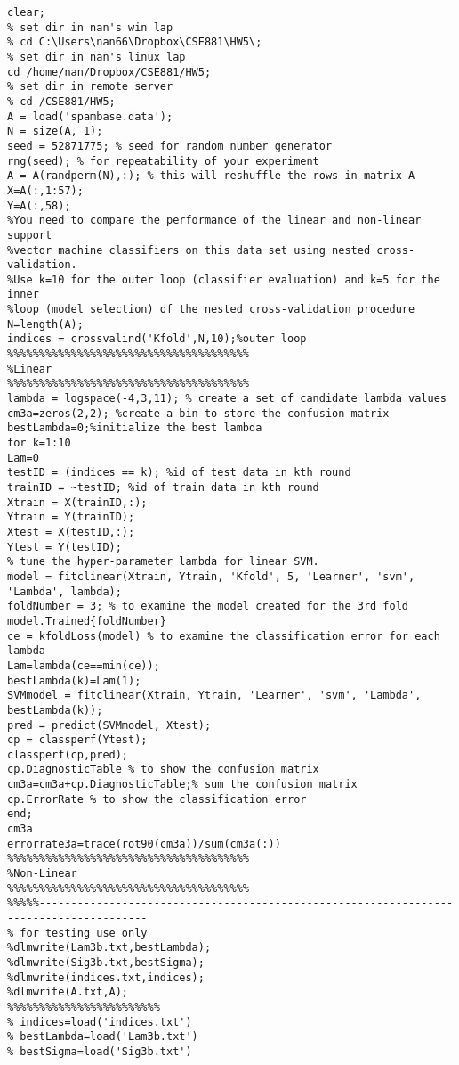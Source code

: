 \documentclass[11pt]{scrartcl}
\begin{document}
\begin{lstlisting}[keywordstyle=\color{blue!70},commentstyle=\color{red!50!green!50!blue!50},frame=shadowbox, rulesepcolor=\color{red!20!green!20!blue!20}] 
% NAN CAO CSE881 HW5
clear;
% set dir in nan's win lap
% cd C:\Users\nan66\Dropbox\CSE881\HW5\;
% set dir in nan's linux lap
cd /home/nan/Dropbox/CSE881/HW5;
% set dir in remote server
% cd /CSE881/HW5;
A = load('spambase.data');
N = size(A, 1);
seed = 52871775; % seed for random number generator
rng(seed); % for repeatability of your experiment
A = A(randperm(N),:); % this will reshuffle the rows in matrix A
X=A(:,1:57);
Y=A(:,58);
%You need to compare the performance of the linear and non-linear support
%vector machine classifiers on this data set using nested cross-validation.
%Use k=10 for the outer loop (classifier evaluation) and k=5 for the inner
%loop (model selection) of the nested cross-validation procedure
N=length(A);
indices = crossvalind('Kfold',N,10);%outer loop
%%%%%%%%%%%%%%%%%%%%%%%%%%%%%%%%%%%%%%
%Linear
%%%%%%%%%%%%%%%%%%%%%%%%%%%%%%%%%%%%%%
lambda = logspace(-4,3,11); % create a set of candidate lambda values
cm3a=zeros(2,2); %create a bin to store the confusion matrix
bestLambda=0;%initialize the best lambda
for k=1:10
Lam=0
testID = (indices == k); %id of test data in kth round
trainID = ~testID; %id of train data in kth round
Xtrain = X(trainID,:);
Ytrain = Y(trainID);
Xtest = X(testID,:);
Ytest = Y(testID);
% tune the hyper-parameter lambda for linear SVM.
model = fitclinear(Xtrain, Ytrain, 'Kfold', 5, 'Learner', 'svm', 'Lambda', lambda);
foldNumber = 3; % to examine the model created for the 3rd fold
model.Trained{foldNumber}
ce = kfoldLoss(model) % to examine the classification error for each lambda
Lam=lambda(ce==min(ce));
bestLambda(k)=Lam(1);
SVMmodel = fitclinear(Xtrain, Ytrain, 'Learner', 'svm', 'Lambda', bestLambda(k));
pred = predict(SVMmodel, Xtest);
cp = classperf(Ytest);
classperf(cp,pred);
cp.DiagnosticTable % to show the confusion matrix
cm3a=cm3a+cp.DiagnosticTable;% sum the confusion matrix
cp.ErrorRate % to show the classification error
end;
cm3a
errorrate3a=trace(rot90(cm3a))/sum(cm3a(:))
%%%%%%%%%%%%%%%%%%%%%%%%%%%%%%%%%%%%%%
%Non-Linear
%%%%%%%%%%%%%%%%%%%%%%%%%%%%%%%%%%%%%%
%%%%%---------------------------------------------------------------------------------------
% for testing use only
%dlmwrite(Lam3b.txt,bestLambda); 
%dlmwrite(Sig3b.txt,bestSigma); 
%dlmwrite(indices.txt,indices);
%dlmwrite(A.txt,A);
%%%%%%%%%%%%%%%%%%%%%%%%
% indices=load('indices.txt')
% bestLambda=load('Lam3b.txt')
% bestSigma=load('Sig3b.txt')

\end{lstlisting}
\end{document}
